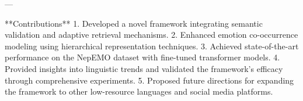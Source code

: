 ---

**Contributions**  
1. Developed a novel framework integrating semantic validation and adaptive retrieval mechanisms.  
2. Enhanced emotion co-occurrence modeling using hierarchical representation techniques.  
3. Achieved state-of-the-art performance on the NepEMO dataset with fine-tuned transformer models.  
4. Provided insights into linguistic trends and validated the framework's efficacy through comprehensive experiments.  
5. Proposed future directions for expanding the framework to other low-resource languages and social media platforms.  